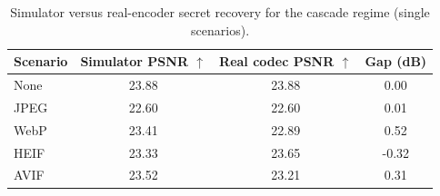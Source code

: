 \begin{table}[t]
\centering
\caption{Simulator versus real-encoder secret recovery for the cascade regime (single scenarios).}
\label{tab:cascade-single-gap}
\begin{tabular}{lccc}
\toprule
Scenario & Simulator PSNR $\uparrow$ & Real codec PSNR $\uparrow$ & Gap (dB) \\
\midrule
None & 23.88 & 23.88 & 0.00 \\
JPEG & 22.60 & 22.60 & 0.01 \\
WebP & 23.41 & 22.89 & 0.52 \\
HEIF & 23.33 & 23.65 & -0.32 \\
AVIF & 23.52 & 23.21 & 0.31 \\
\bottomrule
\end{tabular}
\end{table}
